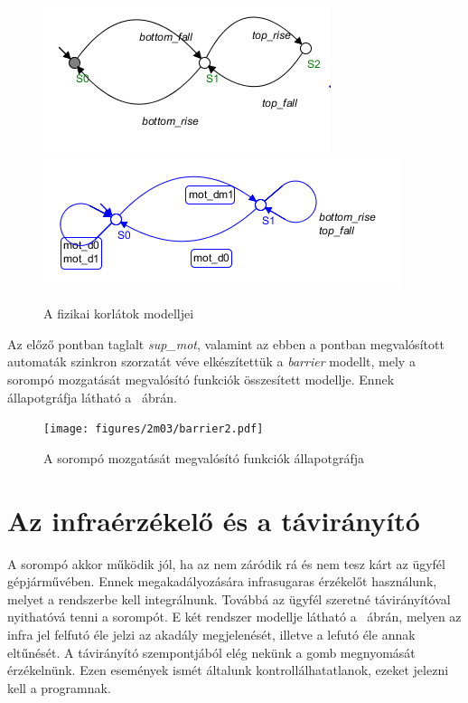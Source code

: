 \begin{figure}
	\centering
	\includegraphics[keepaspectratio]{figures/2m03/b_constraint1.png}	\includegraphics[keepaspectratio]{figures/2m03/b_constraint2.png}
	\caption{A fizikai korlátok modelljei}
	\label{fig:Constraints}
\end{figure}

Az előző pontban taglalt \textit{sup\_mot}, valamint az ebben a pontban megvalósított automaták szinkron szorzatát véve elkészítettük a \textit{barrier} modellt, mely a sorompó mozgatását megvalósító funkciók összesített modellje. Ennek állapotgráfja látható a ~ábrán.

\begin{figure}
	\centering
	\texttt{[image: figures/2m03/barrier2.pdf]}
	\caption{A sorompó mozgatását megvalósító funkciók állapotgráfja}
	\label{fig:Barrier}
\end{figure}




\section{Az infraérzékelő és a távirányító}
A sorompó akkor működik jól, ha az nem záródik rá és nem tesz kárt az ügyfél gépjárművében. Ennek megakadályozására infrasugaras érzékelőt használunk, melyet a rendszerbe kell integrálnunk. Továbbá az ügyfél szeretné távirányítóval nyithatóvá tenni a sorompót. E két rendszer modellje látható a ~ábrán, melyen az infra jel felfutó éle jelzi az akadály megjelenését, illetve a lefutó éle annak eltűnését. A távirányító szempontjából elég nekünk a gomb megnyomását érzékelnünk. Ezen események ismét általunk kontrollálhatatlanok, ezeket jelezni kell a programnak. 

